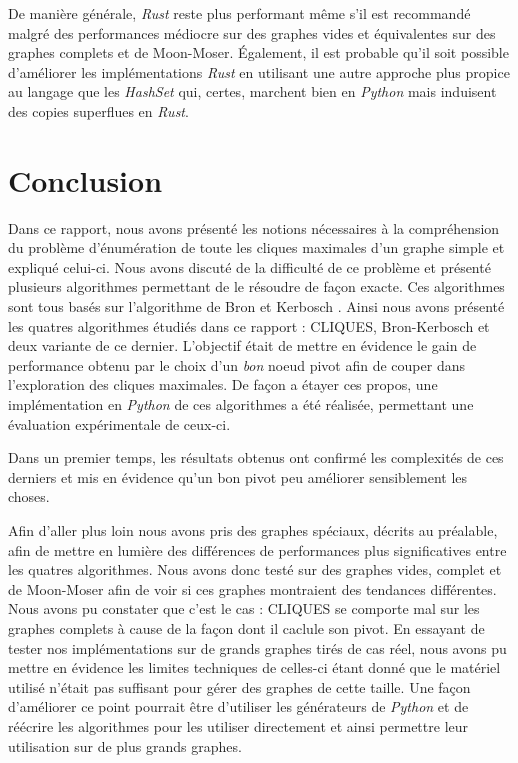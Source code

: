 \documentclass[12pt,a4paper]{article}
\begin{document}
De manière générale, \emph{Rust} reste plus performant même s'il est recommandé malgré des performances médiocre sur des graphes vides et équivalentes sur des graphes complets et de Moon-Moser. Également, il est probable qu'il soit possible d'améliorer les implémentations \emph{Rust} en utilisant une autre approche plus propice au langage que les \emph{HashSet} qui, certes, marchent bien en \emph{Python} mais induisent des copies superflues en \emph{Rust}.

\newpage
\section{Conclusion}

Dans ce rapport, nous avons présenté les notions nécessaires à la compréhension du problème d'énumération de toute les cliques maximales d'un graphe simple et expliqué celui-ci. Nous avons discuté de la difficulté de ce problème et présenté plusieurs algorithmes permettant de le résoudre de façon exacte. Ces algorithmes sont tous basés sur l'algorithme de Bron et Kerbosch \cite{bron1973algorithm}. Ainsi nous avons présenté les quatres algorithmes étudiés dans ce rapport : CLIQUES, Bron-Kerbosch et deux variante de ce dernier. L'objectif était de mettre en évidence le gain de performance obtenu par le choix d'un \emph{bon} noeud pivot afin de couper dans l'exploration des cliques maximales. De façon a étayer ces propos, une implémentation en \emph{Python} de ces algorithmes a été réalisée, permettant une évaluation expérimentale de ceux-ci.

Dans un premier temps, les résultats obtenus ont confirmé les complexités de ces derniers et mis en évidence qu'un bon pivot peu améliorer sensiblement les choses.

Afin d'aller plus loin nous avons pris des graphes spéciaux, décrits au préalable, afin de mettre en lumière des différences de performances plus significatives entre les quatres algorithmes. Nous avons donc testé sur des graphes vides, complet et de Moon-Moser afin de voir si ces graphes montraient des tendances différentes. Nous avons pu constater que c'est le cas : CLIQUES se comporte mal sur les graphes complets à cause de la façon dont il caclule son pivot. En essayant de tester nos implémentations sur de grands graphes tirés de cas réel, nous avons pu mettre en évidence les limites techniques de celles-ci étant donné que le matériel utilisé n'était pas suffisant pour gérer des graphes de cette taille. Une façon d'améliorer ce point pourrait être d'utiliser les générateurs de \emph{Python} et de réécrire les algorithmes pour les utiliser directement et ainsi permettre leur utilisation sur de plus grands graphes.
\end{document}
